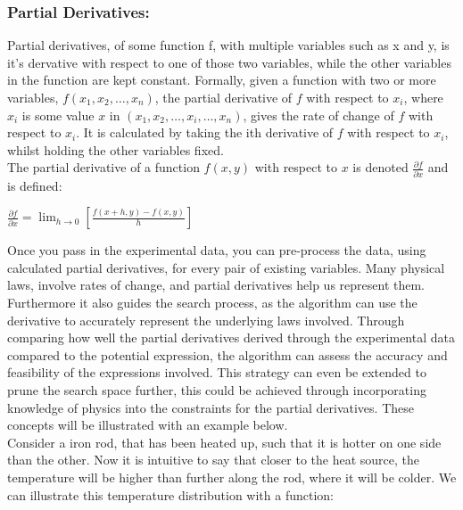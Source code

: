 \documentclass{article}
\begin{document}
\subsubsection{Partial Derivatives: }


Partial derivatives, of some function f, with multiple variables such as x and y, is it's dervative with respect to one of those two variables, while the other variables in the function are kept constant. Formally, given a function with two or more variables, $f(x_1, x_2, \ldots, x_n) $, the partial derivative of $f$ with respect to $x_i$, where $x_i$ is some value $x$ in $(x_1, x_2, \ldots, x_i, \ldots, x_n)$, gives the rate of change of $f$ with respect to $x_i$. It is calculated by taking the ith derivative of $f$ with respect to $x_i$, whilst holding the other variables fixed. \cite{Stewart2012} \cite{Smith2012} \\

The partial derivative of a function $f(x,y)$ with respect to $x$ is denoted $\frac{\partial f}{\partial x}$ \cite{Kelly2021} and is defined: \\ 

\begin{center}

  $\frac{\partial f}{\partial x} = \lim_{h \to 0} \left[ \frac{f(x+h, y) - f(x,y)}{h} \right]$
\end{center}


Once you pass in the experimental data, you can pre-process the data, using calculated partial derivatives, for every pair of existing variables. Many physical laws, involve rates of change, and partial
derivatives help us represent them. Furthermore it also guides the search process, as the algorithm can
use the derivative to accurately represent the underlying laws involved. Through comparing how well
the partial derivatives derived through the experimental data compared to the potential expression,
the algorithm can assess the accuracy and feasibility of the expressions involved. This strategy can
even be extended to prune the search space further, this could be achieved through incorporating
knowledge of physics into the constraints for the partial derivatives. These concepts will be illustrated
with an example below.\\


Consider a iron rod, that has been heated up, such that it is hotter on one side than the other. Now it is intuitive to say that closer to the heat source, the temperature will be higher than further along the rod, where it will be colder. We can illustrate this temperature distribution with a function:  \\
\end{document}
